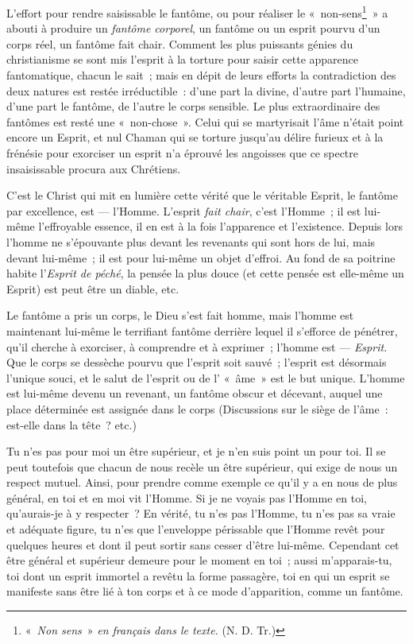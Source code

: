 \documentclass[french,twoside]{book} %
\begin{document}
L’effort pour rendre saisissable le fantôme, ou pour réaliser le « non-sens\footnote{ \noindent « \emph{Non sens} » \emph{en français dans le texte.} (N. D. Tr.)
 } » a abouti à produire un \emph{fantôme corporel}, un fantôme ou un esprit pourvu d’un corps réel, un fantôme fait chair. Comment les plus puissants génies du christianisme se sont mis l’esprit à la torture pour saisir cette apparence fantomatique, chacun le sait ; mais en dépit de leurs efforts la contradiction des deux natures est restée irréductible : d’une part la divine, d’autre part l’humaine, d’une part le fantôme, de l’autre le corps sensible. Le plus extraordinaire des fantômes est resté une « non-chose ». Celui qui se martyrisait l’âme n’était point encore un Esprit, et nul Chaman qui se torture jusqu’au délire furieux et à la frénésie pour exorciser un esprit n’a éprouvé les angoisses que ce spectre insaisissable procura aux Chrétiens.\par
C’est le Christ qui mit en lumière cette vérité que  le véritable Esprit, le fantôme par excellence, est — l’Homme. L’esprit \emph{fait chair}, c’est l’Homme ; il est lui-même l’effroyable essence, il en est à la fois l’apparence et l’existence. Depuis lors l’homme ne s’épouvante plus devant les revenants qui sont hors de lui, mais devant lui-même ; il est pour lui-même un objet d’effroi. Au fond de sa poitrine habite l’\emph{Esprit de péché}, la pensée la plus douce (et cette pensée est elle-même un Esprit) est peut être un diable, etc.\par
Le fantôme a pris un corps, le Dieu s’est fait homme, mais l’homme est maintenant lui-même le terrifiant fantôme derrière lequel il s’efforce de pénétrer, qu’il cherche à exorciser, à comprendre et à exprimer ; l’homme est — \emph{Esprit.} Que le corps se dessèche pourvu que l’esprit soit sauvé ; l’esprit est désormais l’unique souci, et le salut de l’esprit ou de l’ « âme » est le but unique. L’homme est lui-même devenu un revenant, un fantôme obscur et décevant, auquel une place déterminée est assignée dans le corps (Discussions sur le siège de l’âme : est-elle dans la tête ? etc.)\par
Tu n’es pas pour moi un être supérieur, et je n’en suis point un pour toi. Il se peut toutefois que chacun de nous recèle un être supérieur, qui exige de nous un respect mutuel. Ainsi, pour prendre comme exemple ce qu’il y a en nous de plus général, en toi et en moi vit l’Homme. Si je ne voyais pas l’Homme en toi, qu’aurais-je à y respecter ? En vérité, tu n’es pas l’Homme, tu n’es pas sa vraie et adéquate figure, tu n’es que l’enveloppe périssable que l’Homme revêt pour quelques heures et dont il peut sortir sans cesser d’être lui-même. Cependant cet être général et supérieur demeure pour le moment en toi ; aussi m’apparais-tu, toi dont un esprit immortel a revêtu la forme passagère, toi en qui un esprit se manifeste sans être lié à ton corps et à ce mode d’apparition, comme un fantôme.\par
\end{document}

